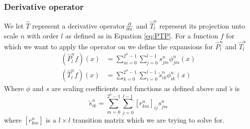 \documentclass[../master_thesis.tex]{subfiles}
\begin{document}
\subsubsection{Derivative operator}
We let $\hat{T}$ represent a derivative operator$\frac{\partial}{\partial x}$ and  $\hat{T}^n_{l}$
represent its projection unto scale $n$ with order $l$ as defined as in Equation
\ref{eq:PTP}. For a function $f$ for which we want to apply the operator on we
define the expansions for $\hat{P}^n_l$ and $\hat{T}^n_{l}$ \cite{Beylkin1999AdaptiveSO}
\begin{equation}
  \begin{aligned}
    \left(\hat{P}^{n}_{l} f\right)(x) &=\sum_{m=0}^{2^{n}-1} \sum_{j=0}^{l-1} s_{j m}^{n} \phi_{j m}^{n}(x) \\
    \left(\hat{T}^{n}_{l} f\right)(x) &=\sum_{k=0}^{2^{n}-1} \sum_{i=0}^{l-1} \tilde{s}_{i k}^{n} \phi_{i k}^{n}(x)
  \end{aligned}
\end{equation}
Where $\phi$ and $s$ are scaling coefficients and functions as defined above and $\tilde{s}$ is
\begin{equation}\label{eq:scalingdiff}
\tilde{s}_{i k}^{n}=\sum_{m=0}^{2^{n}-1} \sum_{j=0}^{l-1}\left[r_{k m}^{n}\right]_{i j} s_{j m}^{n}
\end{equation}
where $\left[r_{k m}^{n}\right]$ is a $l\times l$ transition matrix which we are
trying to solve for.
\end{document}
